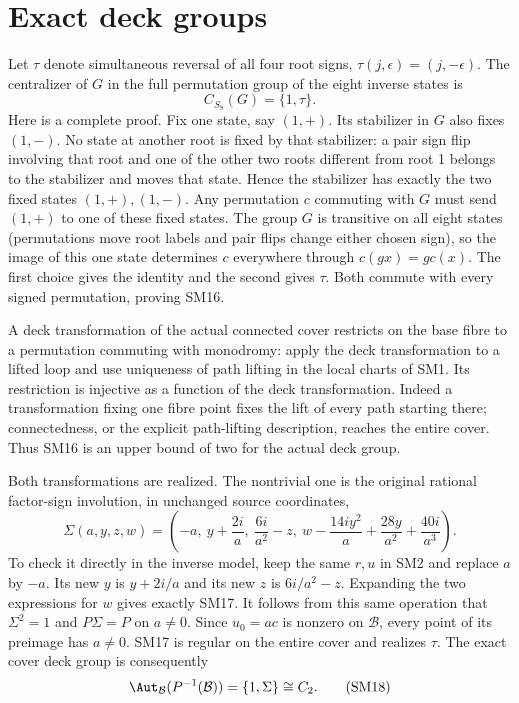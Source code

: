 \documentclass[11pt]{article}
\begin{document}
\section{Exact deck groups}
Let $\tau$ denote simultaneous reversal of all four root signs,
$\tau(j,\epsilon)=(j,-\epsilon)$. The centralizer of $G$ in
the full permutation group of the eight inverse states is
\begin{equation}
 C_{S_8}(G)=\{1,\tau\}.\tag{SM16}
\end{equation}
Here is a complete proof. Fix one state, say $(1,+)$. Its
stabilizer in $G$ also fixes $(1,-)$. No state at another root
is fixed by that stabilizer: a pair sign flip involving that
root and one of the other two roots different from root 1
belongs to the stabilizer and moves that state. Hence the
stabilizer has exactly the two fixed states $(1,+),(1,-)$.
Any permutation $c$ commuting with $G$ must send $(1,+)$ to
one of these fixed states. The group $G$ is transitive on all
eight states (permutations move root labels and pair flips
change either chosen sign), so the image of this one state
determines $c$ everywhere through $c(gx)=g c(x)$. The first
choice gives the identity and the second gives $\tau$.
Both commute with every signed permutation, proving SM16.

A deck transformation of the actual connected cover restricts
on the base fibre to a permutation commuting with monodromy:
apply the deck transformation to a lifted loop and use uniqueness
of path lifting in the local charts of SM1. Its restriction is
injective as a function of the deck transformation. Indeed a
transformation fixing one fibre point fixes the lift of every
path starting there; connectedness, or the explicit path-lifting
description, reaches the entire cover. Thus SM16 is an upper
bound of two for the actual deck group.

Both transformations are realized. The nontrivial one is the
original rational factor-sign involution, in unchanged source
coordinates,
\begin{equation}
 \Sigma(a,y,z,w)=\left(-a,\ y+\frac{2i}{a},\
 \frac{6i}{a^2}-z,\
 w-\frac{14iy^2}{a}+\frac{28y}{a^2}+\frac{40i}{a^3}\right).
 \tag{SM17}
\end{equation}
To check it directly in the inverse model, keep the same $r,u$
in SM2 and replace $a$ by $-a$. Its new $y$ is $y+2i/a$ and
its new $z$ is $6i/a^2-z$. Expanding the two expressions for
$w$ gives exactly SM17. It follows from this same operation
that $\Sigma^2=1$ and $P\Sigma=P$ on $a\ne0$. Since $u_0=ac$
is nonzero on $\mathcal B$, every point of its preimage has
$a\ne0$. SM17 is regular on the entire cover and realizes
$\tau$. The exact cover deck group is consequently
\begin{equation}
 \Aut_{\mathcal B}(P^{-1}(\mathcal B))=\{1,\Sigma\}\cong C_2.
 \tag{SM18}
\end{equation}
\end{document}
